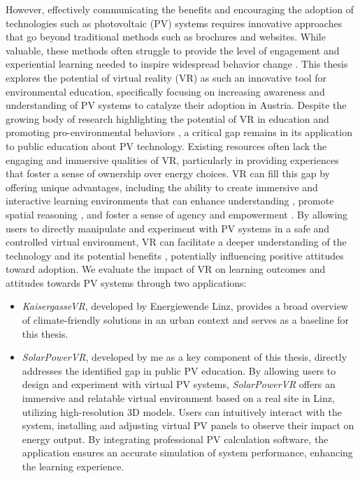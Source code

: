 \documentclass[draft, final]{vutinfth} %
\begin{document}
However, effectively communicating the benefits and encouraging the adoption of technologies such as photovoltaic (PV) systems requires innovative approaches that go beyond traditional methods such as brochures and websites. While valuable, these methods often struggle to provide the level of engagement and experiential learning needed to inspire widespread behavior change \cite{Hassan2020Digitality}. This thesis explores the potential of virtual reality (VR) as such an innovative tool for environmental education, specifically focusing on increasing awareness and understanding of PV systems to catalyze their adoption in Austria. Despite the growing body of research highlighting the potential of VR in education \cite{HuAu2018VrExperience,Merchant2014VrEffectiveness} and promoting pro-environmental behaviors \cite{Queiroz2023Efficacy,McEvoy2023Climate}, a critical gap remains in its application to public education about PV technology. Existing resources often lack the engaging and immersive qualities of VR, particularly in providing experiences that foster a sense of ownership over energy choices. VR can fill this gap by offering unique advantages, including the ability to create immersive and interactive learning environments that can enhance understanding \cite{HuAu2018VrExperience, Winn2002Immersion}, promote spatial reasoning \cite{Dalgarno2010Learning, Sung2015Effects, Winn2002Immersion}, and foster a sense of agency and empowerment \cite{Gee2009Deep}. By allowing users to directly manipulate and experiment with PV systems in a safe and controlled virtual environment, VR can facilitate a deeper understanding of the technology and its potential benefits \cite{Mikropoulos2011VrEducational}, potentially influencing positive attitudes toward adoption. We evaluate the impact of VR on learning outcomes and attitudes towards PV systems through two applications: 

\begin{itemize}
    \item \textit{KaisergasseVR}, developed by Energiewende Linz, provides a broad overview of climate-friendly solutions in an urban context and serves as a baseline for this thesis.
    \item \textit{SolarPowerVR}, developed by me as a key component of this thesis, directly addresses the identified gap in public PV education. By allowing users to design and experiment with virtual PV systems, \textit{SolarPowerVR} offers an immersive and relatable virtual environment based on a real site in Linz, utilizing high-resolution 3D models. Users can intuitively interact with the system, installing and adjusting virtual PV panels to observe their impact on energy output. By integrating professional PV calculation software, the application ensures an accurate simulation of system performance, enhancing the learning experience.
\end{itemize}
\end{document}

